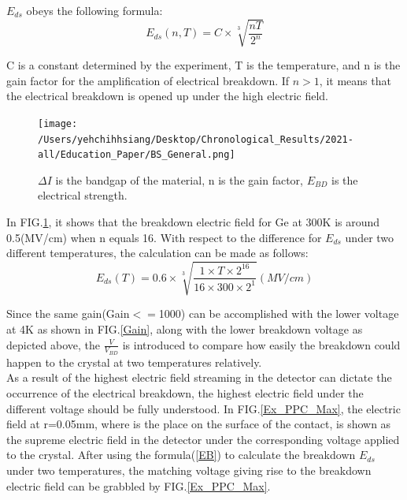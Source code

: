 \documentclass[%
 reprint,
 amsmath,amssymb,
 aps,
]{revtex4-2}
\begin{document}
$E_{ds}$ obeys the following formula\cite{2020AIPA...10b5003Z}:
\begin{equation}\label{EB}
E_{ds}(n,T) = C \times \sqrt[3]{\frac{nT}{2^{n}}}
\end{equation}

C is a constant determined by the experiment, T is the temperature, and n is the gain factor for the amplification of electrical breakdown. If $n>1$, it means that the electrical breakdown is opened up under the high electric field.\\

\begin{figure}[h]
  \centering
  \texttt{[image: /Users/yehchihhsiang/Desktop/Chronological\_Results/2021-all/Education\_Paper/BS\_General.png]}
  \caption{$\Delta I$ is the bandgap of the material, n is the gain factor, $E_{BD}$ is the electrical strength.}
  \label{BS_General}
\end{figure}

In FIG.\ref{BS_General}\cite{2020AIPA...10b5003Z}, it shows that the breakdown electric field for Ge at 300K is around 0.5(MV/cm) when n equals 16.
With respect to the difference for $E_{ds}$ under two different temperatures, the calculation can be made as follows:
\begin{equation}\label{EB}
E_{ds}(T) = 0.6 \times \sqrt[3]{\frac{1 \times T \times 2^{16}}{16 \times 300 \times 2^{1}}} (MV/cm)
\end{equation}


Since the same gain(Gain$<=$1000) can be accomplished with the lower voltage at 4K as shown in FIG.\ref{Gain}, along with the lower breakdown voltage as depicted above, the $\frac{V}{V_{BD}}$ is introduced to compare how easily the breakdown could happen to the crystal at two temperatures relatively.\\  

As a result of the highest electric field streaming in the detector can dictate the occurrence of the electrical breakdown, the highest electric field under the different voltage should be fully understood. In FIG.\ref{Ex_PPC_Max}, the electric field at r=0.05mm, where is the place on the surface of the contact, is shown as the supreme electric field in the detector under the corresponding voltage applied to the crystal. After using the formula(\ref{EB}) to calculate the breakdown $E_{ds}$ under two temperatures, the matching voltage giving rise to the breakdown electric field can be grabbled by FIG.\ref{Ex_PPC_Max}.\\
\end{document}

